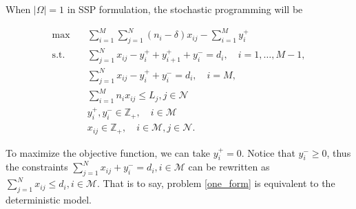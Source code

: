 
When $|\Omega| =1$ in SSP formulation, the stochastic programming will be 

\begin{equation}\label{one_form}
  \begin{aligned}
  \max \quad & \sum_{i=1}^{M}  \sum_{j= 1}^{N} (n_i-\delta) x_{ij} - \sum_{i=1}^{M} y_{i}^{+}  \\
  \text {s.t.} \quad & \sum_{j= 1}^{N} x_{ij} - y_{i}^{+}+ y_{i+1}^{+} + y_{i}^{-} = d_{i}, \quad i = 1, \ldots, M-1, \\
  & \sum_{j= 1}^{N} x_{ij} -y_{i}^{+} + y_{i}^{-} = d_{i}, \quad i = M, \\
  & \sum_{i=1}^{M} n_{i} x_{ij} \leq L_j, j \in \mathcal{N}\\
  & y_{i}^{+}, y_{i}^{-} \in \mathbb{Z}_{+}, \quad i \in \mathcal{M} \\
  & x_{ij} \in \mathbb{Z}_{+}, \quad i \in \mathcal{M}, j \in \mathcal{N}.
  \end{aligned}
\end{equation}

To maximize the objective function, we can take $y_i^{+} = 0$. Notice that $y_{i}^{-} \geq 0$, thus the constraints $\sum_{j= 1}^{N} x_{ij} + y_{i}^{-} = d_{i}, i \in \mathcal{M}$ can be rewritten as $\sum_{j= 1}^{N} x_{ij} \leq d_{i}, i \in \mathcal{M}$. That is to say, problem \ref{one_form} is equivalent to the deterministic model.


